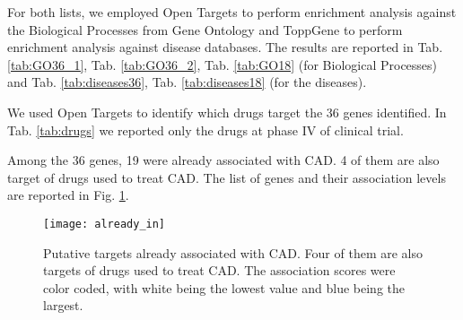 \documentclass[fleqn,10pt]{SelfArx} %
\begin{document}
For both lists, we employed Open Targets to perform enrichment analysis against the Biological Processes from Gene Ontology and ToppGene to perform enrichment analysis against disease databases. The results are reported in Tab. \ref{tab:GO36_1}, Tab. \ref{tab:GO36_2}, Tab. \ref*{tab:GO18} (for Biological Processes) and Tab. \ref{tab:diseases36}, Tab. \ref{tab:diseases18} (for the diseases).

We used Open Targets to identify which drugs target the 36 genes identified. In Tab. \ref{tab:drugs} we reported only the drugs at phase IV of clinical trial.

Among the 36 genes, 19 were already associated with CAD. 4 of them are also target of drugs used to treat CAD. The list of genes and their association levels are reported in Fig. \ref{fig:19CAD}.

\begin{figure}[ht]
	\texttt{[image: already\_in]}
	\smallskip
	\caption{Putative targets already associated with CAD. Four of them are also targets of drugs used to treat CAD. The association scores were color coded, with white being the lowest value and blue being the largest.}
	\label{fig:19CAD}
\end{figure}

\renewcommand{\arraystretch}{1.1}
\end{document}
